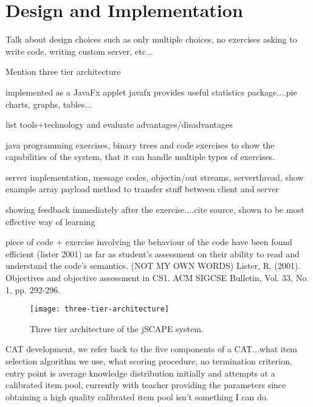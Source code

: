 \chapter{Design and Implementation}
\label{chap:implementation}
Talk about design choices such as only multiple choices, no exercises asking to write code, writing custom server, etc...

Mention three tier architecture

implemented as a JavaFx applet
javafx provides useful statistics package....pie charts, graphs, tables...

list tools+technology and evaluate advantages/disadvantages

java programming exercises, binary trees and code exercises to show the capabilities of the system, that it can handle multiple types of exercises.

server implementation, message codes, objectin/out streams, serverthread, show example array payload method to transfer stuff between client and server

showing feedback immediately after the exercise....cite source, shown to be most effective way of learning

piece of code + exercise involving the behaviour of the code have been found efficient (lister 2001) as far as student's assessment on their ability to read and understand the code's semantics. (NOT MY OWN WORDS) Lister, R. (2001). Objectives and objective assessment in CS1. ACM SIGCSE Bulletin, Vol. 33, No. 1, pp. 292-296.

\begin{figure}[H]
\centering
\texttt{[image: three-tier-architecture]}
\caption{Three tier architecture of the jSCAPE system.}
\label{fig:three-tier-architecture}
\end{figure}


CAT development, we refer back to the five components of a CAT...what item selection algorithm we use, what scoring procedure, no termination criterion, entry point is average knowledge distribution initially and attempts at a calibrated item pool, currently with teacher providing the parameters since obtaining a high quality calibrated item pool isn't something I can do.
\newpage



\newpage



